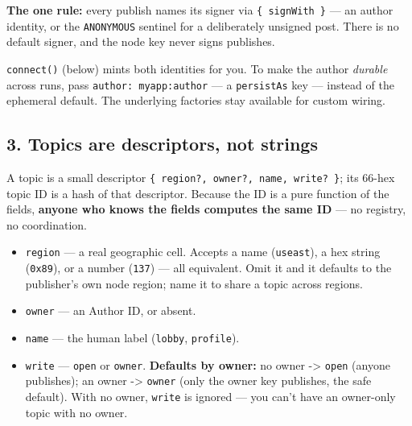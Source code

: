 \documentclass[
  nobib]{tufte-handout}
\providecommand{\tightlist}{%
  \setlength{\itemsep}{0pt}\setlength{\parskip}{0pt}}
\begin{document}
\textbf{The one rule:} every publish names its signer via
\texttt{\{\ signWith\ \}} --- an author identity, or the
\texttt{ANONYMOUS} sentinel for a deliberately unsigned post. There is
no default signer, and the node key never signs publishes.

\texttt{connect()} (below) mints both identities for you. To make the
author \emph{durable} across runs, pass
\texttt{author:\ \textquotesingle{}myapp:author\textquotesingle{}} --- a
\texttt{persistAs} key --- instead of the ephemeral default. The
underlying factories stay available for custom wiring.

\subsection{3. Topics are descriptors, not
strings}\label{topics-are-descriptors-not-strings}

A topic is a small descriptor
\texttt{\{\ region?,\ owner?,\ name,\ write?\ \}}; its 66-hex topic ID
is a hash of that descriptor. Because the ID is a pure function of the
fields, \textbf{anyone who knows the fields computes the same ID} --- no
registry, no coordination.

\begin{itemize}
\tightlist
\item
  \texttt{region} --- a real geographic cell. Accepts a name
  (\texttt{\textquotesingle{}useast\textquotesingle{}}), a hex string
  (\texttt{\textquotesingle{}0x89\textquotesingle{}}), or a number
  (\texttt{137}) --- all equivalent. Omit it and it defaults to the
  publisher's own node region; name it to share a topic across regions.
\item
  \texttt{owner} --- an Author ID, or absent.
\item
  \texttt{name} --- the human label
  (\texttt{\textquotesingle{}lobby\textquotesingle{}},
  \texttt{\textquotesingle{}profile\textquotesingle{}}).
\item
  \texttt{write} --- \texttt{\textquotesingle{}open\textquotesingle{}}
  or \texttt{\textquotesingle{}owner\textquotesingle{}}.
  \textbf{Defaults by owner:} no owner -\textgreater{}
  \texttt{\textquotesingle{}open\textquotesingle{}} (anyone publishes);
  an owner -\textgreater{}
  \texttt{\textquotesingle{}owner\textquotesingle{}} (only the owner key
  publishes, the safe default). With no owner, \texttt{write} is ignored
  --- you can't have an owner-only topic with no owner.
\end{itemize}
\end{document}

